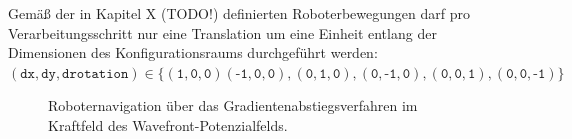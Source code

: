 Gemäß der in Kapitel X (TODO!) definierten Roboterbewegungen darf pro Verarbeitungsschritt nur eine Translation um eine Einheit entlang der Dimensionen des Konfigurationsraums  durchgeführt werden: $ (\texttt{dx}, \texttt{dy}, \texttt{drotation}) \in \{(\texttt{1},\texttt{0},\texttt{0})(\texttt{-1},\texttt{0},\texttt{0}),(\texttt{0},\texttt{1},\texttt{0}),(\texttt{0},\texttt{-1},\texttt{0}),(\texttt{0},\texttt{0},\texttt{1}),(\texttt{0},\texttt{0},\texttt{-1})\}$
\vspace*{0.1cm}
\begin{figure}[h!]
	\centering
	\footnotesize
	\centerline{}
	\caption{Roboternavigation über das Gradientenabstiegsverfahren im Kraftfeld des Wavefront-Potenzialfelds.}
\end{figure}




